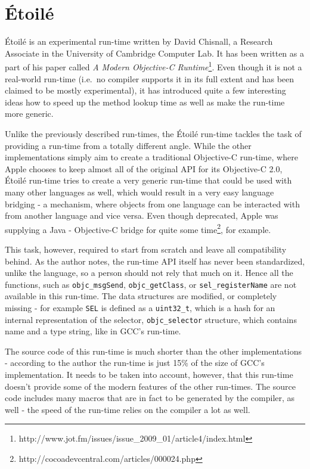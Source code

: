 \chapter{\'Etoil\'e}

\'Etoil\'e is an experimental run-time written by David Chisnall, a Research Associate in the University of Cambridge Computer Lab. It has been written as a part of his paper called \emph{A Modern Objective-C Runtime}\footnote{http://www.jot.fm/issues/issue\_2009\_01/article4/index.html}. Even though it is not a real-world run-time (i.e.\ no compiler supports it in its full extent and has been claimed to be mostly experimental), it has introduced quite a few interesting ideas how to speed up the method lookup time as well as make the run-time more generic.

Unlike the previously described run-times, the \'Etoil\'e run-time tackles the task of providing a run-time from a totally different angle. While the other implementations simply aim to create a traditional Objective-C run-time, where Apple chooses to keep almost all of the original API for its Objective-C 2.0, \'Etoil\'e run-time tries to create a very generic run-time that could be used with many other languages as well, which would result in a very easy language bridging - a mechanism, where objects from one language can be interacted with from another language and vice versa. Even though deprecated, Apple was supplying a Java - Objective-C bridge for quite some time\footnote{http://cocoadevcentral.com/articles/000024.php}, for example.

This task, however, required to start from scratch and leave all compatibility behind. As the author notes, the run-time API itself has never been standardized, unlike the language, so a person should not rely that much on it. Hence all the functions, such as \verb=objc_msgSend=, \verb=objc_getClass=, or \verb=sel_registerName= are not available in this run-time. The data structures are modified, or completely missing - for example \verb=SEL= is defined as a \verb=uint32_t=, which is a hash for an internal representation of the selector, \verb=objc_selector= structure, which contains name and a type string, like in GCC's run-time. 

The source code of this run-time is much shorter than the other implementations - according to the author the run-time is just 15\% of the size of GCC's implementation. It needs to be taken into account, however, that this run-time doesn't provide some of the modern features of the other run-times. The source code includes many macros that are in fact to be generated by the compiler, as well - the speed of the run-time relies on the compiler a lot as well.

